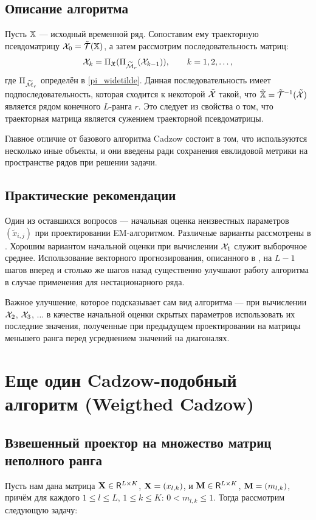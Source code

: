 \documentclass[12pt,a4paper,fleqn,leqno]{article}
\begin{document}
\subsection{Описание алгоритма}
Пусть $\mathbb{X}$ --- исходный временной ряд. Сопоставим ему траекторную псевдоматрицу $\mathcal{X}_0 = \tilde{\mathcal{T}}(\mathbb{X})$, а затем рассмотрим последовательность матриц:
\begin{equation*}
\mathcal{X}_k = \Pi_{\mathfrak{X}} (\Pi_{\widetilde{\mathcal{M}}_r} (\mathcal{X}_{k-1})), \qquad k = 1, 2, \ldots,
\end{equation*}
где $\Pi_{\widetilde{\mathcal{M}}_r}$ определён в \eqref{pi_widetilde}. Данная последовательность имеет подпоследовательность, которая сходится к некоторой $\tilde{\mathcal{X}}$ такой, что $\tilde{\mathbb{X}} = \tilde{\mathcal{T}}^{-1}(\tilde{\mathcal{X}})$ является рядом конечного $L$-ранга $r$. Это следует из свойства о том, что траекторная матрица является сужением траекторной псевдоматрицы.

Главное отличие от базового алгоритма Cadzow состоит в том, что используются несколько иные объекты, и они введены ради сохранения евклидовой метрики на пространстве рядов при решении задачи.

\subsection{Практические рекомендации}
Один из оставшихся вопросов --- начальная оценка неизвестных параметров $(\tilde x_{i,j})$ при проектировании EM-алгоритмом. Различные варианты рассмотрены в \cite{Srebro2003}. Хорошим вариантом начальной оценки при вычислении $\mathcal{X}_1$ служит выборочное среднее. Использование векторного прогнозирования, описанного в \cite{Golyandina.etal2001}, на $L - 1$ шагов вперед и столько же шагов назад существенно улучшают работу алгоритма в случае применения для нестационарного ряда.

Важное улучшение, которое подсказывает сам вид алгоритма --- при вычислении $\mathcal{X}_2$, $\mathcal{X}_3$, $\ldots$ в качестве начальной оценки скрытых параметров использовать их последние значения, полученные при предыдущем проектировании на матрицы меньшего ранга перед усреднением значений на диагоналях.

\section{Еще один Cadzow-подобный алгоритм (Weigthed Cadzow)}
\subsection{Взвешенный проектор на множество матриц неполного ранга} \label{weigh_unfull}
Пусть нам дана матрица $\mathbf{X} \in \mathsf{R}^{L \times K}$, $\mathbf{X} = (x_{l,k})$, и $\mathbf{M} \in \mathsf{R}^{L \times K}$, $\mathbf{M} = (m_{l,k})$, причём для каждого $1 \le l \le L$, $1 \le k \le K$: $0 < m_{l,k} \le 1$. Тогда рассмотрим следующую задачу:
\end{document}
